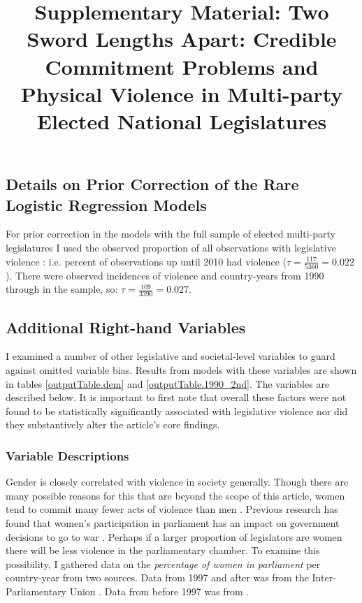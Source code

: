 \documentclass[a4paper]{article}\usepackage[]{graphicx}\usepackage[]{color}
\title{Supplementary Material: Two Sword Lengths Apart: Credible Commitment Problems and Physical Violence in Multi-party Elected National Legislatures}
\begin{document}
\maketitle






\subsection*{Details on Prior Correction of the Rare Logistic Regression Models}

For prior correction \citep[see][]{KingRareEventsPA2001} in the models with the full sample of elected multi-party legislatures I used the observed proportion of all observations with legislative violence : i.e.  percent of observations up until 2010 had violence ($\tau = \frac{117}{5360} = 0.022$). There were  observed incidences of violence and  country-years from 1990 through  in the sample, so: $\tau = \frac{109}{3390} = 0.027$.

\subsection*{Additional Right-hand Variables}


I examined a number of other legislative and societal-level variables to guard against omitted variable bias. Results from models with these variables are shown in tables \ref{outputTable.dem} and \ref{outputTable.1990_2nd}. The variables are described below. It is important to first note that overall these factors were not found to be statistically significantly associated with legislative violence nor did they substantively alter the article's core findings.

\subsubsection*{Variable Descriptions}

Gender is closely correlated with violence in society generally. Though there are many possible reasons for this that are beyond the scope of this article, women tend to commit many fewer acts of violence than men \citep[]{Schwartz2009}. Previous research has found that women's participation in parliament has an impact on government decisions to go to war \citep{Melander2005}. Perhaps if a larger proportion of legislators are women there will be less violence in the parliamentary chamber. To examine this possibility, I gathered data on the \emph{percentage of women in parliament} per country-year from two sources. Data from 1997 and after was from the Inter-Parliamentary Union \citeyearpar{IPU2013}. Data from before 1997 was from \cite{Schwartz2009}.
\end{document}
